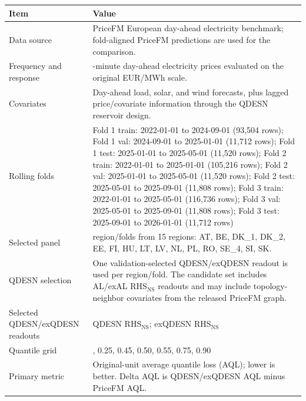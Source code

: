 \begin{tabular}{>{\raggedright\arraybackslash}p{}>{\raggedright\arraybackslash}p{}}
\toprule
Item & Value
\\
\midrule
Data source & PriceFM European day-ahead electricity benchmark; fold-aligned PriceFM predictions are used for the comparison.
\\
Frequency and response & 15-minute day-ahead electricity prices evaluated on the original EUR/MWh scale.
\\
Covariates & Day-ahead load, solar, and wind forecasts, plus lagged price/covariate information through the QDESN reservoir design.
\\
Rolling folds & Fold 1 train: 2022-01-01 to 2024-09-01 (93,504 rows); Fold 1 val: 2024-09-01 to 2025-01-01 (11,712 rows); Fold 1 test: 2025-01-01 to 2025-05-01 (11,520 rows); Fold 2 train: 2022-01-01 to 2025-01-01 (105,216 rows); Fold 2 val: 2025-01-01 to 2025-05-01 (11,520 rows); Fold 2 test: 2025-05-01 to 2025-09-01 (11,808 rows); Fold 3 train: 2022-01-01 to 2025-05-01 (116,736 rows); Fold 3 val: 2025-05-01 to 2025-09-01 (11,808 rows); Fold 3 test: 2025-09-01 to 2026-01-01 (11,712 rows)
\\
Selected panel & 42 region/folds from 15 regions: AT, BE, DK\_1, DK\_2, EE, FI, HU, LT, LV, NL, PL, RO, SE\_4, SI, SK.
\\
QDESN selection & One validation-selected QDESN/exQDESN readout is used per region/fold. The candidate set includes AL/exAL RHS\(_{\mathrm{NS}}\) readouts and may include topology-neighbor covariates from the released PriceFM graph.
\\
Selected QDESN/exQDESN readouts & QDESN RHS\(_{\mathrm{NS}}\); exQDESN RHS\(_{\mathrm{NS}}\)
\\
Quantile grid & 0.10, 0.25, 0.45, 0.50, 0.55, 0.75, 0.90
\\
Primary metric & Original-unit average quantile loss (AQL); lower is better. Delta AQL is QDESN/exQDESN AQL minus PriceFM AQL.
\\
\bottomrule
\end{tabular}

